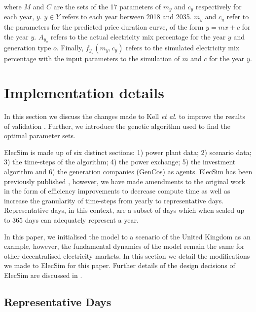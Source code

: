 \noindent where $M$ and $C$ are the sets of the 17 parameters of $m_y$ and $c_y$ respectively for each year, $y$. $y\in Y$ refers to each year between 2018 and 2035. $m_y$ and $c_y$ refer to the parameters for the predicted price duration curve, of the form $y=mx+c$ for the year $y$. $A_{y_o}$ refers to the actual electricity mix percentage for the year $y$ and generation type $o$. Finally, $f_{y_o}(m_y,c_y)$ refers to the simulated electricity mix percentage with the input parameters to the simulation of $m$ and $c$ for the year $y$.





\section{Implementation details}
\label{sec:details}

In this section we discuss the changes made to Kell \textit{et al.} to improve the results of validation \cite{Kell}. Further, we introduce the genetic algorithm used to find the optimal parameter sets.


ElecSim is made up of six distinct sections: 1) power plant data; 2) scenario data; 3) the time-steps of the algorithm; 4) the power exchange; 5) the investment algorithm and 6) the generation companies (GenCos) as agents. ElecSim has been previously published \cite{Kell}, however, we have made amendments to the original work in the form of  efficiency improvements to decrease compute time as well as increase the granularity of time-steps from yearly to representative days.  Representative days, in this context, are a subset of days which when scaled up to 365 days can adequately represent a year. 

In this paper, we initialised the model to a scenario of the United Kingdom as an example, however, the fundamental dynamics of the model remain the same for other decentralised electricity markets. In this section we detail the modifications we made to ElecSim for this paper. Further details of the design decisions of ElecSim are discussed in \cite{Kell}.


\subsection{Representative Days}
\label{ssec:representative_days}

